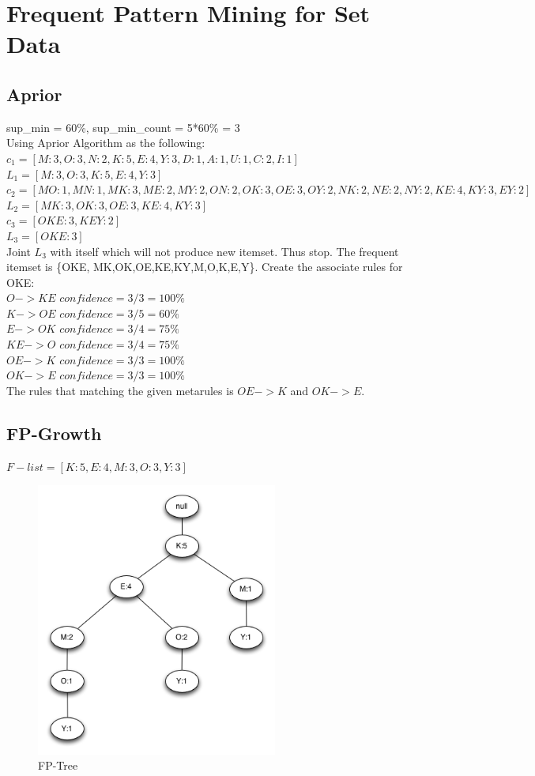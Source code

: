 \documentclass[11pt]{article} %
\begin{document}
\section{Frequent Pattern Mining for Set Data}
\subsection{Aprior}
sup\_min = 60\%, sup\_min\_count = 5*60\% = 3\\
Using Aprior Algorithm as the following:\\
$c_1=[M:3,O:3,N:2,K:5,E:4,Y:3,D:1,A:1,U:1,C:2,I:1]$\\
$L_1=[M:3,O:3,K:5,E:4,Y:3]$\\
$c_2=[MO:1,MN:1,MK:3,ME:2,MY:2,ON:2,OK:3,OE:3,OY:2,NK:2,NE:2,NY:2,KE:4,KY:3,EY:2]$\\
$L_2=[MK:3,OK:3,OE:3,KE:4,KY:3]$\\
$c_3=[OKE:3,KEY:2]$\\
$L_3=[OKE:3]$\\
Joint $L_3$ with itself which will not produce new itemset. Thus stop. The frequent itemset is \{OKE, MK,OK,OE,KE,KY,M,O,K,E,Y\}. Create the associate rules for OKE:\\
$O -> KE$ $confidence= 3/3 = 100\%$\\
$K -> OE$ $confidence= 3/5 = 60\%$\\
$E -> OK$ $confidence= 3/4 = 75\%$\\
$KE -> O$ $confidence= 3/4 = 75\%$\\
$OE -> K$ $confidence= 3/3 = 100\%$\\
$OK -> E$ $confidence= 3/3 = 100\%$\\
The rules that matching the given metarules is $OE -> K$ and $OK -> E$.
\subsection{FP-Growth}
$F-list = [K:5,E:4,M:3,O:3,Y:3]$
\begin{figure}[htbp]
\begin{center}
\includegraphics[width=300px]{fptree.png}
\caption{FP-Tree}
\label{default}
\end{center}
\end{figure}
\end{document}
